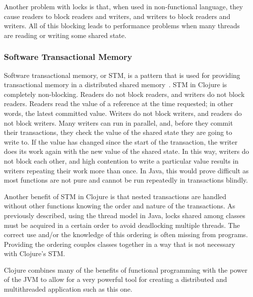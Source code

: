Another problem with locks is that, when used in non-functional language, they cause 
readers to block readers and writers, and writers to block readers and
writers. 
All of this blocking leads to performance problems when many threads are reading or writing some shared state.

\subsubsection{Software Transactional Memory}
Software transactional memory, or STM, is a pattern that is used for
providing transactional memory in a distributed shared
memory~\cite{stm}. 
STM in Clojure is completely non-blocking. 
Readers do not block readers, and writers do not block readers. 
Readers read the value of a reference at the time requested; in other
words, the latest committed value. 
Writers do not block writers, and readers do not block writers. 
Many writers can run in parallel, and, before they commit their
transactions, they check the value of the shared state they
are going to write to. 
If the value has changed since the start of the transaction, the
writer does its work again with the new value of the shared state. 
In this way, writers do not block each other, and high contention to
write a particular value results in writers repeating their work more
than once. 
In Java, this would prove difficult as most functions are not pure and cannot be run repeatedly in transactions blindly. 

Another benefit of STM in Clojure is that nested transactions are
handled without other functions knowing the order and nature of the
transactions. 
As previously described, using the thread model in Java, locks shared
among classes must be acquired in a certain order to avoid deadlocking
multiple threads. 
The correct use and/or the knowledge of this ordering is often missing
from programs. 
Providing the ordering couples classes together in a way that is not necessary with Clojure's STM.  

Clojure combines many of the benefits of functional programming with the power of the JVM to allow for a very powerful tool for creating a distributed and multithreaded application such as this one.  





